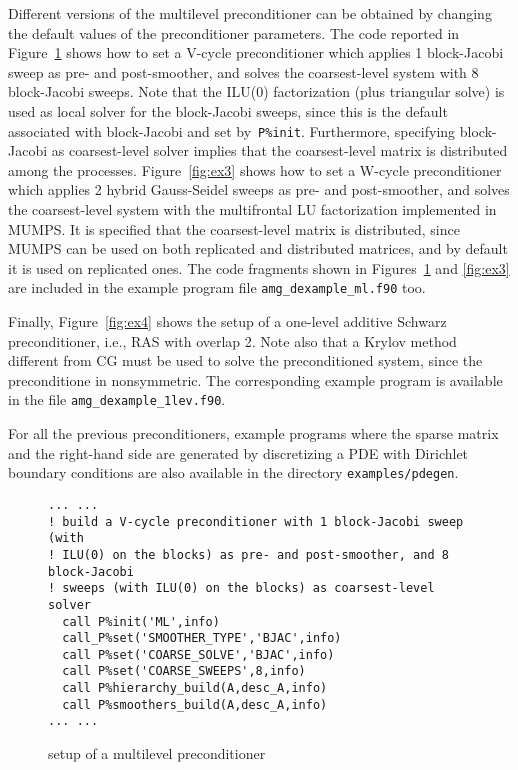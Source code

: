 Different versions of the multilevel preconditioner can be obtained by changing
the default values of the preconditioner parameters. The code reported in
Figure~\ref{fig:ex2} shows how to set a V-cycle preconditioner
which applies 1 block-Jacobi sweep as pre- and post-smoother,
and solves the coarsest-level system with 8 block-Jacobi sweeps.
Note that the ILU(0) factorization (plus triangular solve) is used as
local solver for the block-Jacobi sweeps, since this is the default associated
with block-Jacobi and set by~\verb|P%init|.
Furthermore, specifying block-Jacobi as coarsest-level
solver implies that the coarsest-level matrix is distributed
among the processes.
Figure~\ref{fig:ex3} shows how to set a W-cycle preconditioner which
applies 2 hybrid Gauss-Seidel sweeps as pre- and post-smoother,
and solves the coarsest-level system with the multifrontal LU factorization
implemented in MUMPS. It is specified that the coarsest-level
matrix is distributed, since MUMPS can be used on both
replicated and distributed matrices, and by default
it is used on replicated ones.
The code fragments shown in Figures~\ref{fig:ex2} and \ref{fig:ex3} are
included in the example program file \verb|amg_dexample_ml.f90| too.

Finally, Figure~\ref{fig:ex4} shows the setup of a one-level
additive Schwarz preconditioner, i.e., RAS with overlap 2.
Note also that a Krylov method different from CG must be used to solve
the preconditioned system, since the preconditione in nonsymmetric.
The corresponding example program is available in the file
\verb|amg_dexample_1lev.f90|.

For all the previous preconditioners, example programs where the sparse matrix and
the right-hand side are generated by discretizing a PDE with Dirichlet
boundary conditions are also available in the directory \verb|examples/pdegen|.

\begin{figure}[tbh]
\begin{center}
\begin{minipage}{.90\textwidth}
{\small
\begin{verbatim}
... ...
! build a V-cycle preconditioner with 1 block-Jacobi sweep (with
! ILU(0) on the blocks) as pre- and post-smoother, and 8  block-Jacobi
! sweeps (with ILU(0) on the blocks) as coarsest-level solver
  call P%init('ML',info)
  call_P%set('SMOOTHER_TYPE','BJAC',info)
  call P%set('COARSE_SOLVE','BJAC',info)
  call P%set('COARSE_SWEEPS',8,info)
  call P%hierarchy_build(A,desc_A,info)
  call P%smoothers_build(A,desc_A,info)
... ...
\end{verbatim}
}
\end{minipage}

\caption{setup of a multilevel preconditioner\label{fig:ex2}}
\end{center}
\end{figure}

